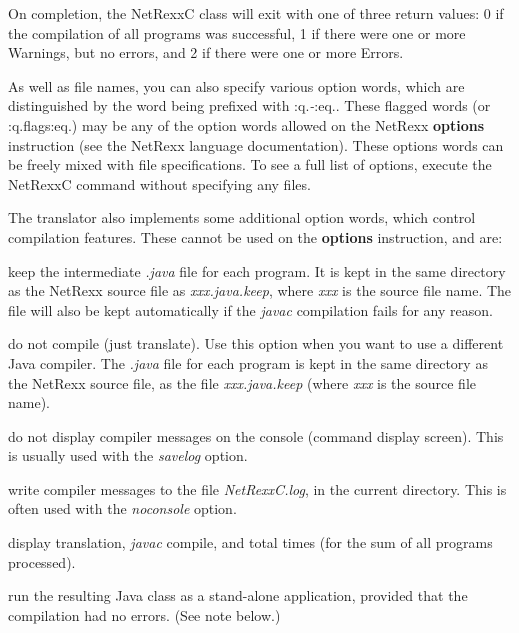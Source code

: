 On completion, the NetRexxC class will exit with one of three return
values: 0 if the compilation of all programs was successful, 1 if there
were one or more Warnings, but no errors, and 2 if there were one or
more Errors.

As well as file names, you can also specify various option words, which
are distinguished by the word being prefixed with :q.\emph{-}:eq..  These
flagged words (or :q.flags:eq.) may be any of the option words allowed
on the NetRexx \textbf{options} instruction (see the NetRexx language
documentation).  These options words can be freely mixed with file
specifications.  To see a full list of options, execute the NetRexxC
command without specifying any files.

The translator also implements some additional option words, which
control compilation features.  These cannot be used on the
\textbf{options} instruction, and are:
\begin{description}
\item[-keep]
keep the intermediate \emph{.java} file for each program.  It is kept in
the same directory as the NetRexx source file as \emph{xxx.java.keep},
where \emph{xxx} is the source file name.  The file will also be kept
automatically if the \emph{javac} compilation fails for any reason.
\item[-nocompile]
do not compile (just translate).  Use this option when you want to use a
different Java compiler.  The \emph{.java} file for each program is kept
in the same directory as the NetRexx source file, as the
file \emph{xxx.java.keep} (where \emph{xxx} is the source file name).
\item[-noconsole]
do not display compiler messages on the console (command display
screen).  This is usually used with the \emph{savelog} option.
\item[-savelog]
write compiler messages to the file \emph{NetRexxC.log}, in the current
directory.
This is often used with the \emph{noconsole} option.
\item[-time]
display translation, \emph{javac} compile, and total times (for the sum
of all programs processed).
\item[-run]
run the resulting Java class as a stand-alone application, provided that
the compilation had no errors.
(See note below.)
\end{description}

